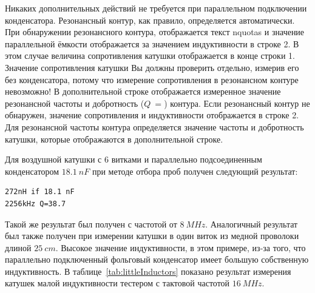Никаких дополнительных действий не требуется при параллельном подключении конденсатора.
Резонансный контур, как правило, определяется автоматически.
При обнаружении резонансного контура, отображается текст nquotas  и значение параллельной ёмкости
отображается за значением индуктивности в строке 2.
В этом случае величина сопротивления катушки отображается в конце строки 1.
Значение сопротивления катушки Вы должны проверить отдельно, измерив его без конденсатора,
потому что измерение сопротивления в резонансном контуре невозможно!
В дополнительной строке отображается измеренное значение резонансной частоты и добротность (\(Q~=\)) контура.
Если резонансный контур не обнаружен, значение сопротивления и индуктивности отображается в строке 2.
Для резонансной частоты контура определяется значение частоты и добротность катушки,
которые отображаются в дополнительной строке.

Для воздушной катушки с 6 витками и параллельно подсоединенным конденсатором \(18.1~nF\) при методе
отбора проб получен следующий результат:

\begin{verbatim}
272nH if 18.1 nF
2256kHz Q=38.7
\end{verbatim}

Такой же результат был получен с частотой от \(8~MHz\).
Аналогичный результат был также получен при измерении катушки в один виток из медной проволоки длиной \(25~cm\).
Высокое значение индуктивности, в этом примере, из-за того, что параллельно подключенный фольговый конденсатор
имеет большую собственную индуктивность.
В таблице~\ref{tab:littleInductors} показано результат измерения катушек малой индуктивности
тестером с тактовой частотой \(16~MHz\).  

